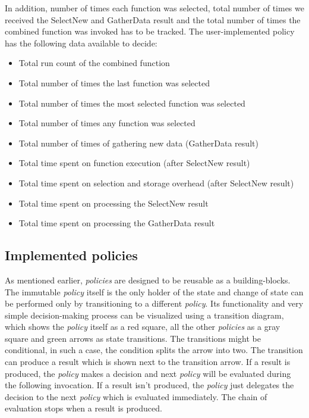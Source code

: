 In addition, number of times each function was selected, total number of times we received the SelectNew and GatherData result and the total number of times the combined function was invoked has to be tracked. The user-implemented policy has the following data available to decide:

\begin{itemize}
	\item Total run count of the combined function
	\item Total number of times the last function was selected
	\item Total number of times the most selected function was selected
	\item Total number of times any function was selected
	\item Total number of times of gathering new data (GatherData result)
	\item Total time spent on function execution (after SelectNew result)
	\item Total time spent on selection and storage overhead (after SelectNew result)
	\item Total time spent on processing the SelectNew result
	\item Total time spent on processing the GatherData result
\end{itemize}

\subsection{Implemented policies}

As mentioned earlier, \textit{policies} are designed to be reusable as a building-blocks. The immutable \textit{policy} itself is the only holder of the state and change of state can be performed only by transitioning to a different \textit{policy}. Its functionality and very simple decision-making process can be visualized using a transition diagram, which shows the \textit{policy} itself as a red square, all the other \textit{policies} as a gray square and green arrows as state transitions. The transitions might be conditional, in such a case, the condition splits the arrow into two. The transition can produce a result which is shown next to the transition arrow. If a result is produced, the \textit{policy} makes a decision and next \textit{policy} will be evaluated during the following invocation. If a result isn't produced, the \textit{policy} just delegates the decision to the next \textit{policy} which is evaluated immediately. The chain of evaluation stops when a result is produced.

